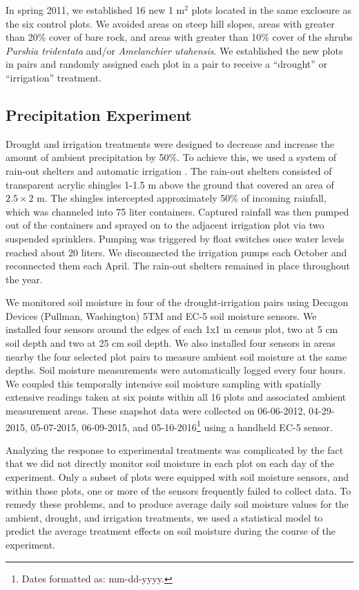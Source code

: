 \documentclass[fleqn,10pt,lineno]{wlpeerj} %
\begin{document}
In spring 2011, we established 16 new 1 m\(^2\) plots located in the
same exclosure as the six control plots. We avoided areas on steep hill
slopes, areas with greater than 20\% cover of bare rock, and areas with
greater than 10\% cover of the shrubs \emph{Purshia tridentata} and/or
\emph{Amelanchier utahensis}. We established the new plots in pairs and
randomly assigned each plot in a pair to receive a ``drought'' or
``irrigation'' treatment.

\subsection{Precipitation Experiment}\label{precipitation-experiment}

Drought and irrigation treatments were designed to decrease and increase
the amount of ambient precipitation by 50\%. To achieve this, we used a
system of rain-out shelters and automatic irrigation
\citep{Gherardi2013}. The rain-out shelters consisted of transparent
acrylic shingles 1-1.5 m above the ground that covered an area of
\(2.5\times2\) m. The shingles intercepted approximately 50\% of
incoming rainfall, which was channeled into 75 liter containers.
Captured rainfall was then pumped out of the containers and sprayed on
to the adjacent irrigation plot via two suspended sprinklers. Pumping
was triggered by float switches once water levels reached about 20
liters. We disconnected the irrigation pumps each October and
reconnected them each April. The rain-out shelters remained in place
throughout the year.

We monitored soil moisture in four of the drought-irrigation pairs using
Decagon Devices (Pullman, Washington) 5TM and EC-5 soil moisture
sensors. We installed four sensors around the edges of each 1x1 m census
plot, two at 5 cm soil depth and two at 25 cm soil depth. We also
installed four sensors in areas nearby the four selected plot pairs to
measure ambient soil moisture at the same depths. Soil moisture
measurements were automatically logged every four hours. We coupled this
temporally intensive soil moisture sampling with spatially extensive
readings taken at six points within all 16 plots and associated ambient
measurement areas. These snapshot data were collected on 06-06-2012,
04-29-2015, 05-07-2015, 06-09-2015, and
05-10-2016\footnote{Dates formatted as: mm-dd-yyyy.} using a handheld
EC-5 sensor.

Analyzing the response to experimental treatments was complicated by the
fact that we did not directly monitor soil moisture in each plot on each
day of the experiment. Only a subset of plots were equipped with soil
moisture sensors, and within those plots, one or more of the sensors
frequently failed to collect data. To remedy these problems, and to
produce average daily soil moisture values for the ambient, drought, and
irrigation treatments, we used a statistical model to predict the
average treatment effects on soil moisture during the course of the
experiment.
\end{document}
